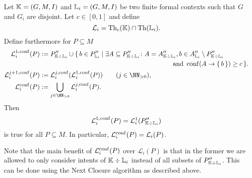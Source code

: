 \begin{Proposition}
  \label{prop:computing-confident-closure-second-try}
  Let ${\mathbb{K}} = (G, M, I)$ and ${\mathbb{L}}_{i} = (G, M, I)$ be two finite formal contexts such
  that $G$ and $G_{i}$ are disjoint.  Let $c \in [0,1]$ and define
  \begin{equation*}
    \mathcal{L}_{i} = \operatorname{Th}_{c}({\mathbb{K}}) \cap \operatorname{Th}({\mathbb{L}}_{i}).
  \end{equation*}
  Define furthermore for $P \subseteq M$
  \begin{align*}
    \mathcal{L}_{i}^{1,\conf}(P) &:= P_{\con K \div \con L_{i}}'' \cup \{\, b \in P_{\con
      L_{i}}'' \mid \exists A \subseteq P_{\con K \div \con L_{i}}'' \st A = A_{\con K
      \div \con L_{i}}'', b \in A_{\con L_{i}}'' \setminus
    P_{\con K \div \con L_{i}}''\\ &\hspace*{20em} \text{ and } \conf(A \to \set{b}) \ge c
    \,\}.\\
    \mathcal{L}_{i}^{j+1,\conf}(P) &:=
    \mathcal{L}_{i}^{j,\conf}(\mathcal{L}_{i}^{1,\conf}(P)) \qquad (j \in \NN_{>0}),\\
    \mathcal{L}_{i}^{\conf}(P) &:= \bigcup_{j \in \NN_{>0}} \mathcal{L}_{i}^{j,\conf}(P).
  \end{align*}
  Then
  \begin{equation*}
    \mathcal{L}_{i}^{1,\operatorname{conf}}(P) = \mathcal{L}_{i}^{1}(P_{{\mathbb{K}} \div {\ensuremath{\mathbb{L}}}_{i}}'')
  \end{equation*}
  is true for all $P \subseteq M$.  In particular, $\mathcal{L}_{i}^{\operatorname{conf}}(P) =
  \mathcal{L}_{i}(P)$.
\end{Proposition}

Note that the main benefit of $\mathcal{L}_{i}^{\operatorname{conf}}(P)$ over $\mathcal{L}_{i}(P)$ is
that in the former we are allowed to only consider intents of ${\mathbb{K}} \div {\ensuremath{\mathbb{L}}}_{i}$
instead of all subsets of $P_{{\mathbb{K}} \div {\ensuremath{\mathbb{L}}}_{i}}''$.  This can be done using the Next
Closure algorithm as described above.

